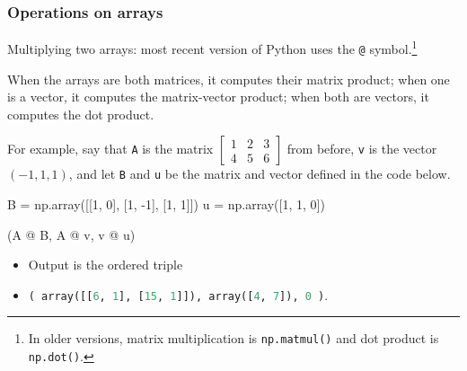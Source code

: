 \documentclass{beamer}
\newenvironment{codeblock}
    {\hfill\begin{beamerboxesrounded}[lower=codecol, width=0.8\textwidth]
    \medskip

    }
    { 
    \end{beamerboxesrounded}\hfill
    }
\theoremstyle{example}
\newcommand{\ct}[1]{\lstinline[language=Python]!#1!}
\newcommand{\ttt}[1]{{\small\texttt{#1}}}
\begin{document}
\begin{frame}[fragile]
\frametitle{Operations on arrays}

Multiplying two arrays: most recent version of Python uses the \ttt{@} symbol.\footnote{In older versions, matrix multiplication is \ttt{np.matmul()} and dot product is \ttt{np.dot()}.} 

When the arrays are both matrices, it computes their matrix product; when one is a vector, it computes the matrix-vector product; when both are vectors, it computes the dot product.


For example, say that \ttt{A} is the matrix $\begin{bmatrix}1 & 2 & 3 \\ 4 & 5 & 6\end{bmatrix}$ from before, \ttt{v} is the vector $(-1, 1, 1)$, and let \ttt{B} and \ttt{u} be the matrix and vector defined in the code below.

\vspace*{12pt}
\begin{codeblock}

\begin{python}
B = np.array([[1, 0], [1, -1], [1, 1]])
u = np.array([1, 1, 0])

(A @ B, A @ v, v @ u)
\end{python}

\end{codeblock}
\begin{itemize}
    \item Output is the ordered triple 
    \item[] \qquad \ct{( array([[6, 1], [15, 1]]), array([4, 7]), 0 )}.
\end{itemize}
\vspace*{12pt}

\end{frame}
\end{document}
